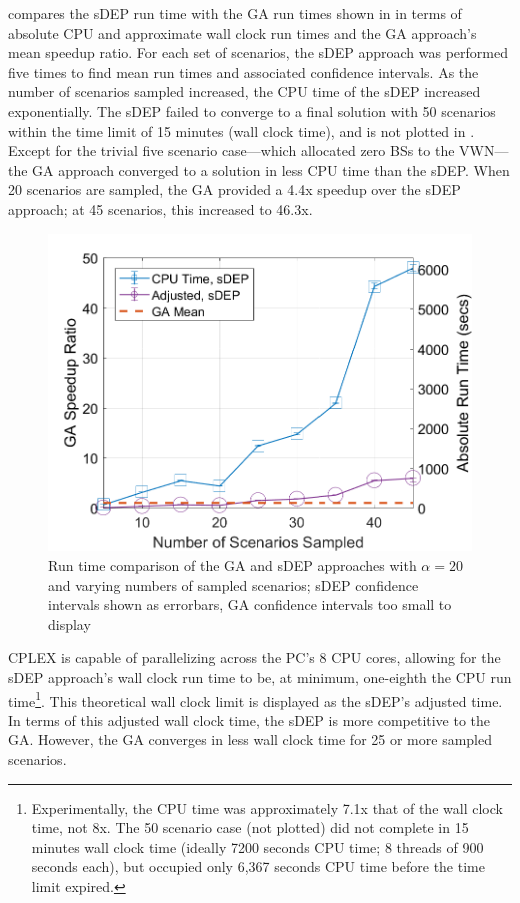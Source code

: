 \documentclass[12pt,dvipsnames]{report}
\begin{document}
 compares the sDEP run time with the GA run times shown in  in terms of absolute CPU and approximate wall clock run times and the GA approach's mean speedup ratio.  For each set of scenarios, the sDEP approach was performed five times to find mean run times and associated confidence intervals.  As the number of scenarios sampled increased, the CPU time of the sDEP increased exponentially.  The sDEP failed to converge to a final solution with 50 scenarios within the time limit of 15 minutes (wall clock time), and is not plotted in .  Except for the trivial five scenario case---which allocated zero BSs to the VWN---the GA approach converged to a solution in less CPU time than the sDEP.  When 20 scenarios are sampled, the GA provided a 4.4x speedup over the sDEP approach; at 45 scenarios, this increased to 46.3x.

\begin{figure}[tp]
	\centering
	\includegraphics[height=0.4\textheight]{Figures/Prelim_VOSGA_SpeedupRatio_AbsComp_alpha20}
	\caption[Preliminary simulation run time comparison of the GA and sDEP approaches with fixed $\alpha$]{Run time comparison of the GA and sDEP approaches with $\alpha = 20$ and varying numbers of sampled scenarios; sDEP confidence intervals shown as errorbars, GA confidence intervals too small to display}
	\label{fig:Prelim_AlgSpeedupRunTime}
\end{figure}

CPLEX is capable of parallelizing across the PC's 8 CPU cores, allowing for the sDEP approach's wall clock run time to be, at minimum, one-eighth the CPU run time\footnote{Experimentally, the CPU time was approximately 7.1x that of the wall clock time, not 8x.  The 50 scenario case (not plotted) did not complete in 15 minutes wall clock time (ideally 7200 seconds CPU time; 8 threads of 900 seconds each), but occupied only 6,367 seconds CPU time before the time limit expired.}.  This theoretical wall clock limit is displayed as the sDEP's adjusted time.  In terms of this adjusted wall clock time, the sDEP is more competitive to the GA.  However, the GA converges in less wall clock time for 25 or more sampled scenarios.
\end{document}
